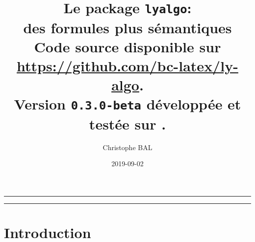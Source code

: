 \documentclass[12pt,a4paper]{article}
\begin{document}
\title{%
	Le package \texttt{lyalgo}:\\%
	des formules plus sémantiques\\%
	{\footnotesize Code source disponible sur \url{https://github.com/bc-latex/ly-algo}.}\\%
{\footnotesize Version \texttt{0.3.0-beta} développée et testée sur \macosxname{}.}%
}
\author{Christophe BAL}
\date{2019-09-02}

\maketitle


\vspace{2em}

\hrule

\tableofcontents

\vspace{1.5em}

\hrule

\newpage


\section{Introduction}
\end{document}

